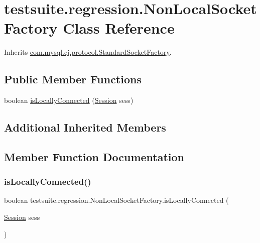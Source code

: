 \hypertarget{classtestsuite_1_1regression_1_1_non_local_socket_factory}{}\section{testsuite.\+regression.\+Non\+Local\+Socket\+Factory Class Reference}
\label{classtestsuite_1_1regression_1_1_non_local_socket_factory}


Inherits \mbox{\hyperlink{classcom_1_1mysql_1_1cj_1_1protocol_1_1_standard_socket_factory}{com.\+mysql.\+cj.\+protocol.\+Standard\+Socket\+Factory}}.

\subsection*{Public Member Functions}
\begin{DoxyCompactItemize}
\item 
boolean \mbox{\hyperlink{classtestsuite_1_1regression_1_1_non_local_socket_factory_a6777c5f47cc9b67f228c1b4cbf46d18d}{is\+Locally\+Connected}} (\mbox{\hyperlink{interfacecom_1_1mysql_1_1cj_1_1_session}{Session}} sess)
\end{DoxyCompactItemize}
\subsection*{Additional Inherited Members}


\subsection{Member Function Documentation}
\mbox{\label{classtestsuite_1_1regression_1_1_non_local_socket_factory_a6777c5f47cc9b67f228c1b4cbf46d18d}} 
\subsubsection{\texorpdfstring{is\+Locally\+Connected()}{isLocallyConnected()}}
{\footnotesize\ttfamily boolean testsuite.\+regression.\+Non\+Local\+Socket\+Factory.\+is\+Locally\+Connected (\begin{DoxyParamCaption}\item[{\mbox{\hyperlink{interfacecom_1_1mysql_1_1cj_1_1_session}{Session}}}]{sess }\end{DoxyParamCaption})}



